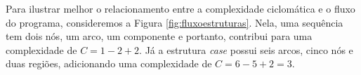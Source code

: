 Para ilustrar melhor o relacionamento entre a complexidade ciclomática e o fluxo do programa, consideremos a Figura \ref{fig:fluxoestruturas}. Nela, uma sequência tem dois nós, um arco, um componente e portanto, contribui para uma complexidade de $C = 1 - 2 + 2$. Já a estrutura \textit{case} possui seis arcos, cinco nós e duas regiões, adicionando uma complexidade de $C = 6 - 5 + 2 = 3$.



%
%
%
%
